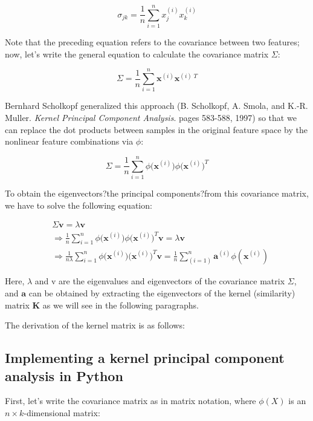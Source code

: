 \documentclass[letterpaper]{report}
\begin{document}
 \[
 \sigma_{jk} = \frac{1}{n} \sum_{i=1}^{n} x_{j}^{(i)} x_{k}^{(i)} 
 \]
 
Note that the preceding equation refers to the covariance between two features; now, let's write the general equation to calculate the covariance matrix $\Sigma$:

\[
\Sigma = \frac{1}{n} \sum_{i=1}^{n} \mathbf{x}^{(i)} \mathbf{x}^{(i)\;T}
\]
 
 Bernhard Scholkopf generalized this approach (B. Scholkopf, A. Smola, and
K.-R. Muller. \textit{Kernel Principal Component Analysis}. pages 583-588, 1997) so that we can replace the dot products between samples in the original feature space by the nonlinear feature combinations via $\phi$:
 
 \[
 \Sigma = \frac{1}{n} \sum_{i=1}^{n} \phi \big( \mathbf{x}^{(i)} \big) \phi \big( \mathbf{x}^{(i)} \big)^T
 \]
 
 To obtain the eigenvectors?the principal components?from this covariance matrix,
we have to solve the following equation:
 
 
\begin{equation*} 
\begin{split}
   & \Sigma \mathbf{v} = \lambda \mathbf{v} \\
   & \Rightarrow \frac{1}{n} \sum_{i=1}^{n} \phi \big( \mathbf{x}^{(i)} \big) \phi \big( \mathbf{x}^{(i)} \big)^T \mathbf{v} = \lambda \mathbf{v} \\
   & \Rightarrow  \frac{1}{n \lambda} \sum^{n}_{i=1} \phi \big( \mathbf{x}^{(i)} \big) \big( \mathbf{x}^{(i)} \big)^T \mathbf{v} = \frac{1}{n} \sum^{n}_{(i=1)} \mathbf{a}^{(i)} \phi (\mathbf{x}^{(i)})
\end{split}
\end{equation*} 

Here, $\lambda$ and v are the eigenvalues and eigenvectors of the covariance matrix $\Sigma$, and $\mathbf{a}$ can be obtained by extracting the eigenvectors of the kernel (similarity) matrix $\mathbf{K}$ as we will see in the following paragraphs.

The derivation of the kernel matrix is as follows:


 
\subsection{Implementing a kernel principal component analysis in Python}

First, let's write the covariance matrix as in matrix notation, where $\phi(X)$ is an $n \times k$-dimensional matrix:
\end{document}
